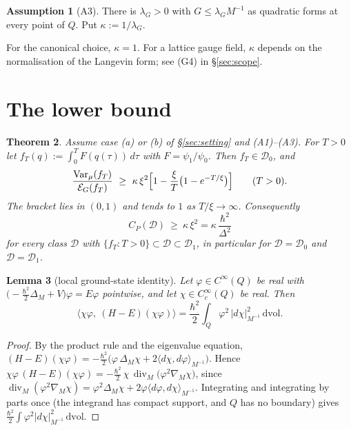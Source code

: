 \documentclass[11pt,a4paper]{article}
\newtheorem{theorem}{Theorem}[section]
\newtheorem{lemma}[theorem]{Lemma}
\theoremstyle{definition}
\newtheorem{assumption}[theorem]{Assumption}
\theoremstyle{remark}
\newcommand{\Var}{\operatorname{Var}}
\newcommand{\cE}{\mathcal{E}}
\newcommand{\cD}{\mathcal{D}}
\newcommand{\dvol}{\,\mathrm{dvol}}
\begin{document}
\begin{assumption}[A3]\label{ass:A3}
There is $\lambda_G>0$ with $G\le\lambda_G M^{-1}$ as quadratic forms at every point of $Q$. Put $\kappa:=1/\lambda_G$.
\end{assumption}

For the canonical choice, $\kappa=1$.
For a lattice gauge field, $\kappa$ depends on the normalisation of the Langevin form; see (G4) in \S\ref{sec:scope}.

\section{The lower bound}\label{sec:main}

\begin{theorem}\label{thm:main}
Assume case (a) or (b) of \S\ref{sec:setting} and (A1)--(A3).
For $T>0$ let $f_T(q):=\int_0^T F(q(\tau))\,d\tau$ with $F=\psi_1/\psi_0$.
Then $f_T\in\cD_0$, and
\begin{equation}\label{eq:window}
  \frac{\Var_\mu(f_T)}{\cE_G(f_T)}\ \ge\ \kappa\,\xi^2\Bigl[1-\frac{\xi}{T}\bigl(1-e^{-T/\xi}\bigr)\Bigr]\qquad(T>0).
\end{equation}
The bracket lies in $(0,1)$ and tends to $1$ as $T/\xi\to\infty$. Consequently
\[
  C_P(\cD)\ \ge\ \kappa\,\xi^2=\kappa\,\frac{\hbar^2}{\Delta^2}
\]
for every class $\cD$ with $\{f_T:T>0\}\subset\cD\subset\cD_1$, in particular for $\cD=\cD_0$ and $\cD=\cD_1$.
\end{theorem}


\begin{lemma}[local ground-state identity]\label{lem:gst}
Let $\varphi\in C^\infty(Q)$ be real with $\bigl(-\tfrac{\hbar^2}{2}\Delta_M+V\bigr)\varphi=E\varphi$ pointwise, and let $\chi\in C_c^\infty(Q)$ be real. Then
\[
  \bigl\langle\chi\varphi,\ (H-E)(\chi\varphi)\bigr\rangle=\frac{\hbar^2}{2}\int_Q\varphi^2\,|d\chi|^2_{M^{-1}}\dvol .
\]
\end{lemma}

\begin{proof}
By the product rule and the eigenvalue equation,
$(H-E)(\chi\varphi)=-\tfrac{\hbar^2}{2}\bigl(\varphi\,\Delta_M\chi+2\langle d\chi,d\varphi\rangle_{M^{-1}}\bigr)$.
Hence $\chi\varphi\,(H-E)(\chi\varphi)=-\tfrac{\hbar^2}{2}\,\chi\,\operatorname{div}_M\bigl(\varphi^2\nabla_M\chi\bigr)$, since $\operatorname{div}_M(\varphi^2\nabla_M\chi)=\varphi^2\Delta_M\chi+2\varphi\langle d\varphi,d\chi\rangle_{M^{-1}}$.
Integrating and integrating by parts once (the integrand has compact support, and $Q$ has no boundary) gives $\tfrac{\hbar^2}{2}\int\varphi^2|d\chi|^2_{M^{-1}}\dvol$.
\end{proof}
\end{document}
